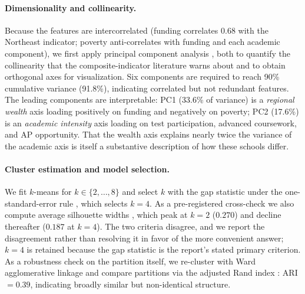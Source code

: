 \paragraph{Dimensionality and collinearity.}
Because the features are intercorrelated (funding correlates $0.68$ with the Northeast
indicator; poverty anti-correlates with funding and each academic component), we first apply
principal component analysis \citep{jolliffe2016}, both to quantify the collinearity that the
composite-indicator literature warns about \citep{nardo2008} and to obtain orthogonal axes for
visualization. Six components are required to reach 90\% cumulative variance (91.8\%),
indicating correlated but not redundant features. The leading components are interpretable:
PC1 (33.6\% of variance) is a \emph{regional wealth} axis loading positively on funding and
negatively on poverty; PC2 (17.6\%) is an \emph{academic intensity} axis loading on test
participation, advanced coursework, and AP opportunity. That the wealth axis explains nearly
twice the variance of the academic axis is itself a substantive description of how these
schools differ.

\paragraph{Cluster estimation and model selection.}
We fit $k$-means \citep{macqueen1967} for $k \in \{2,\dots,8\}$ and select $k$ with the gap
statistic under the one-standard-error rule \citep{tibshirani2001}, which selects $k=4$. As a
pre-registered cross-check we also compute average silhouette widths \citep{rousseeuw1987},
which peak at $k=2$ ($0.270$) and decline thereafter ($0.187$ at $k=4$). The two criteria
disagree, and we report the disagreement rather than resolving it in favor of the more
convenient answer; $k=4$ is retained because the gap statistic is the report's stated primary
criterion. As a robustness check on the partition itself, we re-cluster with Ward
agglomerative linkage \citep{ward1963} and compare partitions via the adjusted Rand index
\citep{hubert1985}: ARI $=0.39$, indicating broadly similar but non-identical structure.

